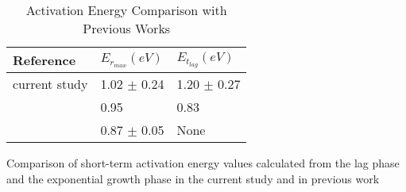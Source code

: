 
\begin{table}[ht]
\centering
\begin{tabular}{lll}
  \hline
  Reference & $E_{r_{max}}(eV)$ & $E_{t_{lag}}(eV)$  \\ 
  \hline
  current study & 1.02 $\pm$ 0.24 & 1.20 $\pm$ 0.27 \\
  \citep{de2018determination} & 0.95 & 0.83 \\ 
  \citep{smith2019community} & 0.87 $\pm$ 0.05 & None \\
  \hline
\end{tabular}

\caption{Activation Energy Comparison with Previous Works}
{\footnotesize Comparison of short-term activation energy values calculated from the lag phase and the exponential growth phase in the current study and in previous work \citep{de2018determination,smith2019community}}
\label{table:E_comp_table}

\end{table}
